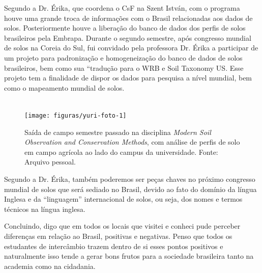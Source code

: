 Segundo a Dr. Érika, que coordena o CsF na Szent István, com o programa houve uma grande troca de informações com o Brasil relacionadas aos dados de solos. Posteriormente houve a liberação do banco de dados dos perfis de solos brasileiros pela Embrapa. Durante o segundo semestre, após congresso mundial de solos na Coreia do Sul, fui convidado pela professora Dr. Érika a participar de um projeto para padronização e homogeneização do banco de dados de solos brasileiros, bem como sua ``tradução para o WRB e Soil Taxonomy US. Esse projeto tem a finalidade de dispor os dados para pesquisa a nível mundial, bem como o mapeamento mundial de solos.\\
\\
\begin{figure}[htbp]
   \centering
   \texttt{[image: figuras/yuri-foto-1]}
   \caption{Saída de campo semestre passado na  disciplina \textit{Modern Soil Observation and Conservation Methods}, com análise de perfis de solo em campo agrícola ao lado do campus da universidade. Fonte: Arquivo pessoal.}
\end{figure}

Segundo a Dr. Érika, também poderemos ser peças chaves no próximo congresso mundial de solos que será sediado no Brasil, devido ao fato do domínio da língua Inglesa e da ``linguagem'' internacional de solos, ou seja, dos nomes e termos técnicos na língua inglesa.

Concluindo, digo que em todos os locais que visitei e conheci pude perceber diferenças em relação ao Brasil, positivas e negativas. Penso que todos os estudantes de intercâmbio trazem dentro de si esses pontos positivos e naturalmente isso tende a gerar bons frutos para a sociedade brasileira tanto na academia como na cidadania.

\address{Yuri A. Gelsleichter\\
  Universidade do Sul de Santa Catarina\\
  }
